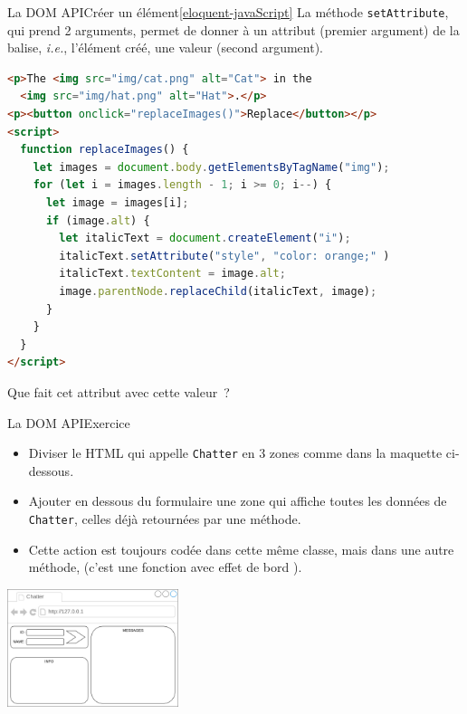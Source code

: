 \documentclass{beamer}
\begin{document}
    \begin{frame}[fragile]{La DOM API}{Créer un élément\cref{eloquent-javaScript}}
        La méthode \lstinline{setAttribute}, qui prend 2 arguments, permet de donner à un attribut (premier argument) de la balise, \textit{i.e.}, l'élément créé, une valeur (second argument).
        \begin{lstlisting}[language=HTML,title={\tiny{HTML}},basicstyle=\tiny\ttfamily]
<p>The <img src="img/cat.png" alt="Cat"> in the
  <img src="img/hat.png" alt="Hat">.</p>
<p><button onclick="replaceImages()">Replace</button></p>
<script>
  function replaceImages() {
    let images = document.body.getElementsByTagName("img");
    for (let i = images.length - 1; i >= 0; i--) {
      let image = images[i];
      if (image.alt) {
        let italicText = document.createElement("i");
        italicText.setAttribute("style", "color: orange;" )
        italicText.textContent = image.alt;
        image.parentNode.replaceChild(italicText, image);
      }
    }
  }
</script>
        \end{lstlisting}
        Que fait cet attribut avec cette valeur~?
    \end{frame}

    \begin{frame}{La DOM API}{Exercice \execcounterdispinc{}}
        \begin{itemize}
            \item Diviser le HTML qui appelle \lstinline{Chatter} en 3 zones comme dans la maquette ci-dessous.
            \item Ajouter en dessous du formulaire une zone qui affiche toutes les données de \lstinline{Chatter}, celles déjà retournées par une méthode.
            \item Cette action est toujours codée dans cette même classe, mais dans une autre méthode, (c'est une fonction avec effet de bord ).
        \end{itemize}
        \bigbreak
        \center
        \includegraphics[width=5cm]{image/chatter-maquette}
    \end{frame}
\end{document}
